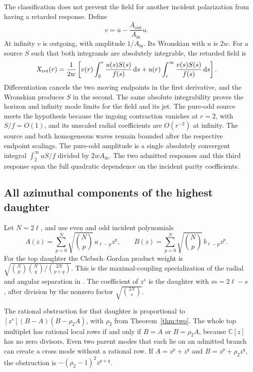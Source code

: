 The classification does not prevent the field for another incident
polarization from having a retarded response. Define
\[
 v=\overline u-\frac{\overline A_{\mathrm{out}}}{A_{\mathrm{in}}}u .
\]
At infinity \(v\) is outgoing, with amplitude \(1/A_{\mathrm{in}}\).
Its Wronskian with \(u\) is \(2w\). For a source \(S\) such that both
integrands are absolutely integrable, the retarded field is
\[
 X_{\rm ret}(r)=\frac{1}{2w}
   \left[
       v(r)\int_2^r \frac{u(s)S(s)}{f(s)}\,\mathrm{d} s+
       u(r)\int_r^\infty \frac{v(s)S(s)}{f(s)}\,\mathrm{d} s
   \right].
\]
Differentiation cancels the two moving endpoints in the first derivative,
and the Wronskian produces \(S\) in the second. The same absolute
integrability proves the horizon and infinity mode limits for the field
and its jet. The pure-odd source meets the hypothesis because the ingoing
contraction vanishes at \(r=2\), with \(S/f=O(1)\), and its unscaled radial
coefficients are \(O(r^{-2})\) at infinity. The source and both homogeneous
waves remain bounded after the respective endpoint scalings. The pure-odd
amplitude is a single absolutely convergent integral \(\int_2^\infty
uS/f\) divided by \(2w A_{\mathrm{in}}\).
The two admitted responses and this third response span the full quadratic
dependence on the incident parity coefficients.

\subsection{All azimuthal components of the highest daughter}
\label{sec:angular-followon}

Let \(N=2\ell\), and use even and odd incident polynomials
\[
 A(z)=\sum_{p=0}^N \sqrt{\binom{N}{p}}\,a_{\ell-p} z^p,\qquad
 B(z)=\sum_{p=0}^N \sqrt{\binom{N}{p}}\,b_{\ell-p} z^p.
\]
For the top daughter the Clebsch--Gordan product weight is
\(\sqrt{\binom{N}{p}\binom{N}{q}/\binom{2N}{p+q}}\).
This is the maximal-coupling specialization of the radial and angular
separation in \cite[Sec.~V.4]{bucciotti}. The coefficient of \(z^s\) is
the daughter with \(m=2\ell-s\), after division by the nonzero factor
\(\sqrt{\binom{2N}{s}}\).

The rational obstruction for that daughter is proportional to
\([z^s](B-A)(B-\rho_2 A)\), with \(\rho_2\) from
Theorem~\ref{thm:two}. The whole top multiplet has rational local rows
if and only if \(B=A\) or \(B=\rho_2 A\), because
\(\mathbb{C}[z]\) has no zero divisors.
Even two parent modes that each lie on an admitted branch can create
a cross mode without a rational row. If \(A=z^p+z^q\) and
\(B=z^p+\rho_2 z^q\), the obstruction is
\(-(\rho_2-1)^2z^{p+q}\).

